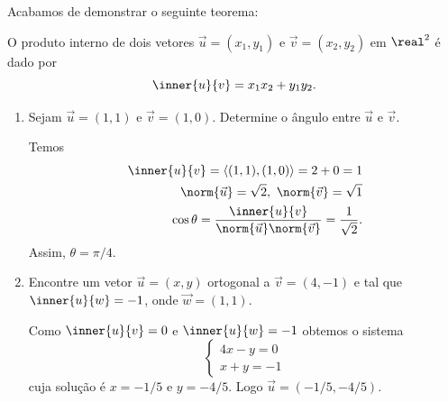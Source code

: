 Acabamos de demonstrar o seguinte teorema:
\begin{teorema}
  O produto interno de dois vetores $\vec{u} = (x_1, y_1)$ e $\vec{v} = (x_2, y_2)$ em $\real^2$ é dado por
  \[
    \inner{u}{v} = x_1x_2 + y_1y_2.
  \]
\end{teorema}

\begin{exemplos}
  \begin{enumerate}
    \item Sejam $\vec{u} = (1, 1)$ e $\vec{v} = (1,0)$. Determine o ângulo entre $\vec{u}$ e $\vec{v}$.
    \begin{solucao}
      Temos
      \begin{align*}
        \inner{u}{v} = \langle (1, 1), (1,0)\rangle = 2 + 0 = 1\\
        \norm{\vec{u}} = \sqrt{2},\ \norm{\vec{v}} = \sqrt{1}\\
        \cos\theta = \frac{\inner{u}{v}}{\norm{\vec{u}}\norm{\vec{v}}} = \dfrac{1}{\sqrt{2}}.
      \end{align*}
      Assim, $\theta = \pi/4$.
    \end{solucao}
    \item Encontre um vetor $\vec{u} = (x, y)$ ortogonal a $\vec{v} = (4, -1)$ e tal que $\inner{u}{w} = -1$, onde $\vec{w} = (1,1)$.
    \begin{solucao}
      Como $\inner{u}{v} = 0$ e $\inner{u}{w} = -1$ obtemos o sistema
      \[
        \begin{cases}
          4x - y = 0\\
          x + y = -1
        \end{cases}
      \]
      cuja solução é $x = -1/5$ e $y = -4/5$. Logo $\vec{u} = (-1/5, -4/5)$.
    \end{solucao}
  \end{enumerate}
\end{exemplos}

